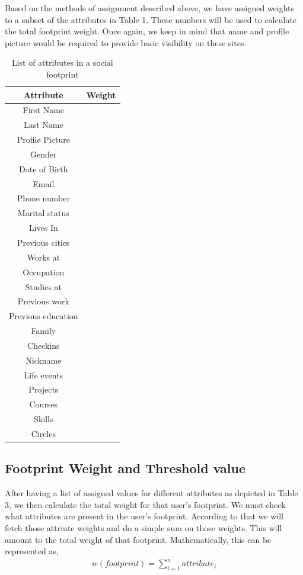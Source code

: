 \documentclass[10pt,conference]{IEEEtran}
\begin{document}
Based on the methods of assignment described above, we have assigned weights to a subset of the attributes in Table 1. These numbers will be used to calculate the total footprint weight. Once again, we keep in mind that name and 
profile picture would be required to provide basic visibility on these sites. 

\begin{table}
	\normalsize
	\centering
 		\begin{tabular}{|| c | c ||} 
 		\hline
 		Attribute & Weight\\  
		\hline\hline
		First Name &  \\
		\hline
		Last Name &  \\
		\hline
		Profile Picture &  \\
		\hline
		Gender &  \\
		\hline
		Date of Birth &  \\
		\hline
		Email &  \\
		\hline
		Phone number &  \\
		\hline
		Marital status &  \\
		\hline
		Lives In &  \\
		\hline
		Previous cities &  \\
		\hline
		Works at &  \\
		\hline
		Occupation &  \\
		\hline
		Studies at &  \\
		\hline
		Previous work &  \\
		\hline
		Previous education &  \\
		\hline
		Family &  \\
		\hline
		Checkins &  \\
		\hline
		Nickname &  \\
		\hline
		Life events &  \\
		\hline
		Projects &  \\
		\hline
		Courses &  \\
		\hline
		Skills &  \\
		\hline		
		Circles &  \\
		\hline
	\end{tabular}
\caption{List of attributes in a social footprint}
\end{table}

\subsection{Footprint Weight and Threshold value}
After having a list of assigned values for different attributes as depicted in Table 3, we then calculate the total weight for that user's footprint. We must check what attributes are present in the user's footprint. According to that we will fetch those attriute weights and do a simple sum on those weights. This will amount to the total weight of that footprint.
Mathematically, this can be represented as,
\begin{align*}
w(footprint) = \sum_{i=1}^{n}attribute_i
\end{align*}
\end{document}
